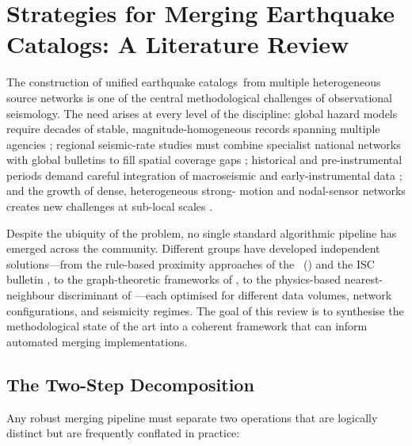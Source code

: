 \documentclass[12pt]{article}
\newcommand{\catalogs}{catalogs}
\newcommand{\Catalogs}{Catalogs}
\begin{document}

\section{Strategies for Merging Earthquake \Catalogs: A Literature Review}
\label{sec:merging}


The construction of unified earthquake \catalogs\ from multiple heterogeneous
source networks is one of the central methodological challenges of observational
seismology.  The need arises at every level of the discipline: global hazard
models require decades of stable, magnitude-homogeneous records spanning
multiple agencies \citep{Pagani2014}; regional seismic-rate studies must combine
specialist national networks with global bulletins to fill spatial coverage gaps
\citep{Woessner2005}; historical and pre-instrumental periods demand careful
integration of macroseismic and early-instrumental data
\citep{Grunthal1998, CPTI15}; and the growth of dense, heterogeneous strong-
motion and nodal-sensor networks creates new challenges at sub-local scales
\citep{Share2022}.

Despite the ubiquity of the problem, no single standard algorithmic pipeline
has emerged across the community.  Different groups have developed independent
solutions—from the rule-based proximity approaches of the
\citeauthor{NCEDCComCat}~(\citeyear{NCEDCComCat}) and the ISC bulletin
\citep{Bondar2011}, to the graph-theoretic frameworks of
\citet{Patton2016}, to the physics-based nearest-neighbour discriminant of
\citet{Tanaka2022}—each optimised for different data volumes, network
configurations, and seismicity regimes.  The goal of this review is to
synthesise the methodological state of the art into a coherent framework that
can inform automated merging implementations.

\subsection{The Two-Step Decomposition}
\label{sec:twostep}

Any robust merging pipeline must separate two operations that are logically
distinct but are frequently conflated in practice:
\end{document}
